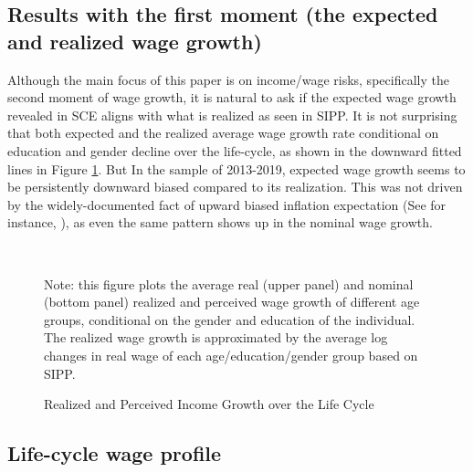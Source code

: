 \subsection{Results with the first moment (the expected and realized wage growth)}

Although the main focus of this paper is on income/wage risks, specifically the second moment of wage growth, it is natural to ask if the expected wage growth revealed in SCE aligns with what is realized as seen in SIPP. It is not surprising that both expected and the realized average wage growth rate conditional on education and gender decline over the life-cycle, as shown in the downward fitted lines in Figure \ref{fig:growth_age_compare}. But In the sample of 2013-2019, expected wage growth seems to be persistently downward biased compared to its realization. This was not driven by the widely-documented fact of upward biased inflation expectation (See for instance, \cite{wang2021infvar}), as even the same pattern shows up in the nominal wage growth.

 \begin{figure}[!ht]
    	\caption{Realized and Perceived Income Growth over the Life Cycle}
    	\label{fig:growth_age_compare}
    	\begin{center}
    	 \\
    	\medskip
    	\end{center}
    	\begin{flushleft} Note: this figure plots the average real (upper panel) and nominal (bottom panel) realized and perceived wage growth of different age groups, conditional on the gender and education of the individual. The realized wage growth is approximated by the average log changes in real wage of each age/education/gender group based on SIPP.\end{flushleft}
    \end{figure}
    

\subsection{Life-cycle wage profile}

